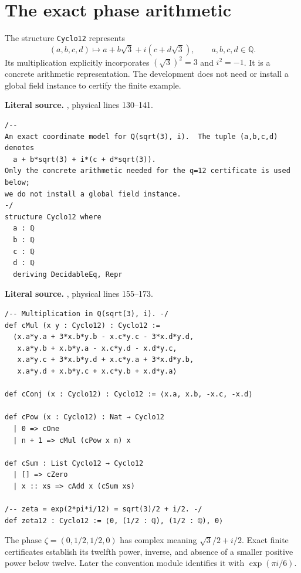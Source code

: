 \section{The exact phase arithmetic}
The structure \texttt{Cyclo12} represents
\[
 (a,b,c,d)\longmapsto a+b\sqrt3+i(c+d\sqrt3),\qquad a,b,c,d\in\mathbb Q.
\]
Its multiplication explicitly incorporates \((\sqrt3)^2=3\) and \(i^2=-1\).
It is a concrete arithmetic representation. The development does not need or
install a global field instance to certify the finite example.

\noindent\textbf{Literal source.} \texttt{}, physical lines 130--141.

\begin{Verbatim}[breaklines=true,breakanywhere=true,fontsize=\footnotesize,samepage=true]
/--
An exact coordinate model for Q(sqrt(3), i).  The tuple (a,b,c,d) denotes
  a + b*sqrt(3) + i*(c + d*sqrt(3)).
Only the concrete arithmetic needed for the q=12 certificate is used below;
we do not install a global field instance.
-/
structure Cyclo12 where
  a : ℚ
  b : ℚ
  c : ℚ
  d : ℚ
  deriving DecidableEq, Repr
\end{Verbatim}

\noindent\textbf{Literal source.} \texttt{}, physical lines 155--173.

\begin{Verbatim}[breaklines=true,breakanywhere=true,fontsize=\footnotesize]
/-- Multiplication in Q(sqrt(3), i). -/
def cMul (x y : Cyclo12) : Cyclo12 :=
  ⟨x.a*y.a + 3*x.b*y.b - x.c*y.c - 3*x.d*y.d,
   x.a*y.b + x.b*y.a - x.c*y.d - x.d*y.c,
   x.a*y.c + 3*x.b*y.d + x.c*y.a + 3*x.d*y.b,
   x.a*y.d + x.b*y.c + x.c*y.b + x.d*y.a⟩

def cConj (x : Cyclo12) : Cyclo12 := ⟨x.a, x.b, -x.c, -x.d⟩

def cPow (x : Cyclo12) : Nat → Cyclo12
  | 0 => cOne
  | n + 1 => cMul (cPow x n) x

def cSum : List Cyclo12 → Cyclo12
  | [] => cZero
  | x :: xs => cAdd x (cSum xs)

/-- zeta = exp(2*pi*i/12) = sqrt(3)/2 + i/2. -/
def zeta12 : Cyclo12 := ⟨0, (1/2 : ℚ), (1/2 : ℚ), 0⟩
\end{Verbatim}

The phase \(\zeta=(0,1/2,1/2,0)\) has complex meaning
\(\sqrt3/2+i/2\). Exact finite certificates establish its twelfth power, inverse,
and absence of a smaller positive power below twelve. Later the convention
module identifies it with \(\exp(\pi i/6)\).

